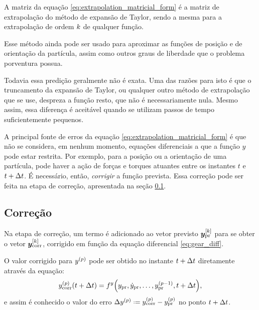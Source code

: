 A matriz da equação \eqref{eq:extrapolation_matricial_form} é a matriz de extrapolação do método de expansão de Taylor, sendo a mesma para a extrapolação de ordem \(k\) de qualquer função.

Esse método ainda pode ser usado para aproximar as funções de posição e de orientação da partícula, assim como outros graus de liberdade que o problema porventura possua.

Todavia essa predição geralmente não é exata. Uma das razões para isto é que o truncamento da expansão de Taylor, ou qualquer outro método de extrapolação que se use, despreza a função resto, que não é necessariamente nula. Mesmo assim, essa diferença é aceitável quando se utilizam passos de tempo suficientemente pequenos. 

A principal fonte de erros da equação \eqref{eq:extrapolation_matricial_form} é que não se considera, em nenhum momento, equações diferenciais a que a função \(y\) pode estar restrita. Por exemplo, para a posição ou a orientação de uma partícula, pode haver a ação de forças e torques atuantes entre os instantes \(t\) e \(t + \Delta t\). É necessário, então, \textit{corrigir} a função prevista. Essa correção pode ser feita na etapa de correção, apresentada na seção \ref{subsec:correction}.

\subsection{Correção} \label{subsec:correction}

Na etapa de correção, um termo é adicionado ao vetor previsto \(\drvec{\taylorOrder}{\predicted{y}}\) para se obter o vetor \(\drvec{\taylorOrder}{\corrected{y}}\), corrigido em função da equação diferencial \eqref{eq:gear_diff}.

O valor corrigido para \(\deriv{\eqOrder}{y}\) pode ser obtido no instante \(t+\Delta t\) diretamente através da equação:
\[
	\corrected{\deriv{\eqOrder}{y}}\pqty{t+\Dt} = \eqFor{y}\pqty{\predicted{y}, \predicted{\deriv{1}{y}},\dots,\predicted{\deriv{\eqOrder-1}{y}}, t+\Dt},
\]
e assim é conhecido o valor do erro \(\Delta \deriv{\eqOrder}{y} \eqdef \corrected{\deriv{\eqOrder}{y}} - \predicted{\deriv{\eqOrder}{y}}\) no ponto \(t+\Delta t\).

